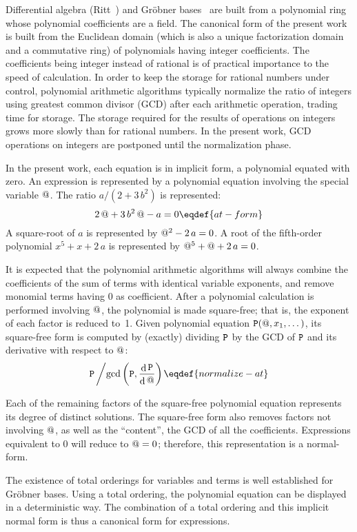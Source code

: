 Differential algebra (Ritt~\cite{ritt1966differential}) and Gr\"obner
bases~\cite{alma991010801422205596} are built from a polynomial ring
whose polynomial coefficients are a field.  The canonical form of the
present work is built from the Euclidean domain (which is also a
unique factorization domain and a commutative ring) of polynomials
having integer coefficients.\numberedfootnote
{The coefficients being integer instead of rational is of practical
 importance to the speed of calculation.  In order to keep the storage
 for rational numbers under control, polynomial arithmetic algorithms
 typically normalize the ratio of integers using greatest common
 divisor (GCD) after each arithmetic operation, trading time for
 storage.  The storage required for the results of operations on
 integers grows more slowly than for rational numbers.  In the present
 work, GCD operations on integers are postponed until the
 normalization phase.}

In the present work, each equation is in implicit form, a polynomial
equated with zero.  An expression is represented by a polynomial
equation involving the special variable ${@}$.  The ratio
$a/(2+3\,b^2)$ is represented:
$$2\,\at+3\,b^2\,\at-a=0\eqdef{at-form}$$
A square-root of $a$ is represented by ${@}^2-2\,a=0$.
A root of the fifth-order polynomial $x^5+x+2\,a$ is represented by
${@}^5+{@}+2\,a=0$.

It is expected that the polynomial arithmetic algorithms will always
combine the coefficients of the sum of terms with identical variable
exponents, and remove monomial terms having 0 as coefficient.  After a
polynomial calculation is performed involving ${@}$, the polynomial is
made square-free; that is, the exponent of each factor is reduced
to~1.  Given polynomial equation ${\tt{P}}({@},x_1,\dots)$, its
square-free form is computed by (exactly) dividing ${\tt{P}}$ by the
GCD of ${\tt{P}}$ and its derivative with respect to ${@}$:
$${{\tt{P}}\left/\gcd\left({\tt{P}},{\diff{\tt{P}}\over\diff\at}\right)\right.}\eqdef{normalize-at}$$

Each of the remaining factors of the square-free polynomial equation
represents its degree of distinct solutions.  The square-free form
also removes factors not involving ${@}$, as well as the ``content'',
the GCD of all the coefficients.  Expressions equivalent to 0 will
reduce to ${@}=0$; therefore, this representation is a normal-form.

The existence of total orderings for variables and terms is well
established for Gr\"obner bases.  Using a total ordering, the
polynomial equation can be displayed in a deterministic way.  The
combination of a total ordering and this implicit normal form is thus
a canonical form for expressions.

